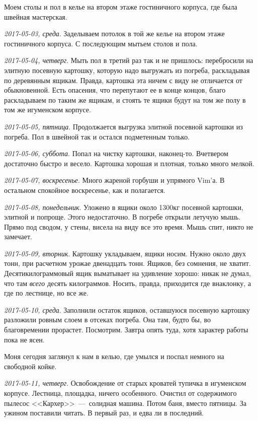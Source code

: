 \documentclass[
    12pt
    ,a4paper
    ,oneside
    ,russian
]{memoir}
\newcommand{\mydatestamp}{
    \bigskip   %
    \emph
}
\newcommand{\mds}{\mydatestamp}
\begin{document}
    Моем столы и пол в келье на втором этаже гостиничного корпуса, где была швейная мастерская.
    
    \mds{2017-05-03, среда}. Заделываем потолок в той же келье на втором этаже гостиничного корпуса. С последующим мытьем столов и пола.
    
    \mds{2017-05-04, четверг}. Мыть пол в третий раз так и не пришлось: перебросили на элитную посевную картошку, которую надо выгружать из погреба, раскладывая по деревянным ящикам. Правда, картошка эта ничем с виду не отличается от обыкновенной. Есть опасения, что перепутают ее в конце концов, благо раскладываем по таким же ящикам, и стоять те ящики будут на том же полу в том же игуменском корпусе.
    
    \mds{2017-05-05, пятница}. Продолжается выгрузка элитной посевной картошки из погреба. Пол в швейной так и остался подметенным только.
    
    \mds{2017-05-06, суббота}. Попал на чистку картошки, наконец-то. Вчетвером достаточно быстро и весело. Картошка хорошая и плотная, только много мелкой.
    
    \mds{2017-05-07, воскресенье}. Много жареной горбуши и упрямого Vim'а. В остальном спокойное воскресенье, как и полагается.
     
    \mds{2017-05-08, понедельник}. Уложено в ящики около 1300кг посевной картошки, элитной и попроще. Этого недостаточно. В погребе открыли летучую мышь. Прямо под сводом, у стены, висела на виду все это время. Мышь спит, никто не замечает.
    
    \mds{2017-05-09, вторник}. Картошку укладываем, ящики носим. Нужно около двух тонн, при расчетном урожае двенадцать тонн. Ящиков, без сомнения, не хватит. Десятикилограммовый ящик выматывает на удивление хорошо: никак не думал, что там \emph{всего} десять килограммов. Носить, правда, приходится где внаклонку, а где по лестнице, но все же.
    
    \mds{2017-05-10, среда}. Заполнили остаток ящиков, оставшуюся посевную картошку разложили ровным слоем в отсеках погреба. Она там, будто бы, во благовремении прорастет. Посмотрим. Завтра опять туда, хотя характер работы пока не ясен.
    
    Моня сегодня заглянул к нам в келью, где умылся и поспал немного на свободной койке.
    
    \mds{2017-05-11, четверг}. Освобождение от старых кроватей тупичка в игуменском корпусе. Лестница, площадка, ничего особенного. Очистил от содержимого пылесос <<Кархер>>~---~солидная машина. Потом баня, вместо пятницы. За ужином поставили читать. В первый раз, и едва ли в последний.
\end{document}
